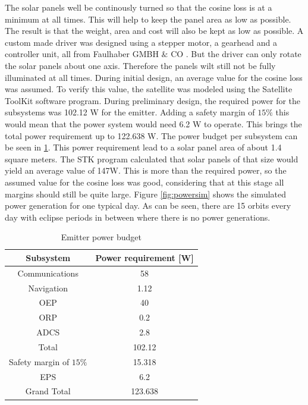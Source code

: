 The solar panels well be continously turned so that the cosine loss is at a minimum at all times. This will help to keep the panel area as low as possible. The result is that the weight, area and cost will also be kept as low as possible. A custom made driver was designed using a stepper motor, a gearhead and a controller unit, all from Faulhaber GMBH $\&$ CO \cite{faulhaber}. But the driver can only rotate the solar panels about one axis. Therefore the panels wilt still not be fully illuminated at all times. During initial design, an average value for the cosine loss was assumed. To verify this value, the satellite was modeled using the Satellite ToolKit software program. During preliminary design, the required power for the subsystems was 102.12 W for the emitter. Adding a safety margin of $15\%$ this would mean that the power system would need 6.2 W to operate. This brings the total power requirement up to 122.638 W. The power budget per subsystem can be seen in \ref{tab:emitterPowerBudget}. This power requirement lead to a solar panel area of about 1.4 square meters. The STK program calculated that solar panels of that size would yield an average value of 147W. This is more than the required power, so the assumed value for the cosine loss was good, considering that at this stage all margins should still be quite large.  Figure \ref{fig:powersim} shows the simulated power generation for one typical day. As can be seen, there are 15 orbits every day with eclipse periods in between where there is no power generations.

\begin{table}
\centering
\begin{tabular}{cc}
\hline
Subsystem & Power requirement [W]\\
\midrule
Communications & 58\\
Navigation & 1.12\\
OEP & 40\\
ORP & 0.2\\
ADCS & 2.8\\
\midrule
Total & 102.12\\
Safety margin of $15\%$ & 15.318\\
EPS & 6.2\\
\midrule
\midrule
Grand Total & 123.638\\
\hline
\end{tabular}
\caption{Emitter power budget}
\label{tab:emitterPowerBudget}
\end{table}

